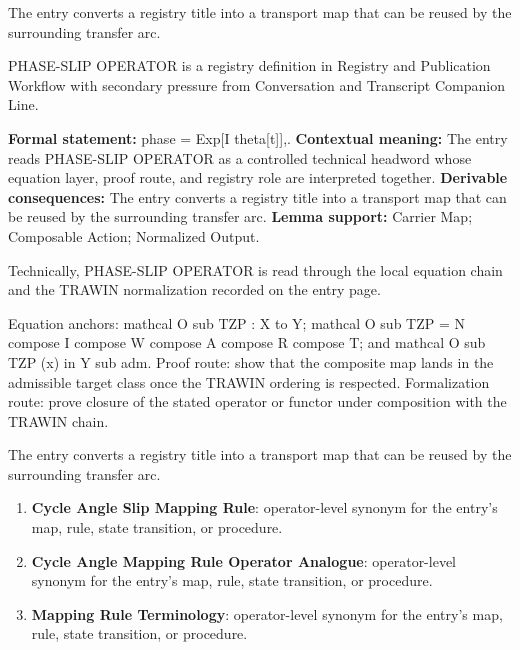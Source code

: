 The entry converts a registry title into a transport map that can be reused by the surrounding transfer arc.
\clearpage


\begingroup\small
{}
PHASE-SLIP OPERATOR is a registry definition in Registry and Publication Workflow with secondary pressure from Conversation and Transcript Companion Line.

\begingroup\footnotesize\setlength{\emergencystretch}{3em}\sloppy
\textbf{Formal statement:} phase = Exp[I theta[t]],. \textbf{Contextual meaning:} The entry reads PHASE-SLIP OPERATOR as a controlled technical headword whose equation layer, proof route, and registry role are interpreted together. \textbf{Derivable consequences:} The entry converts a registry title into a transport map that can be reused by the surrounding transfer arc. \textbf{Lemma support:} Carrier Map; Composable Action; Normalized Output.\par
\endgroup

Technically, PHASE-SLIP OPERATOR is read through the local equation chain and the TRAWIN normalization recorded on the entry page.

Equation anchors: mathcal O sub TZP : X to Y; mathcal O sub TZP = N compose I compose W compose A compose R compose T; and mathcal O sub TZP (x) in Y sub adm. Proof route: show that the composite map lands in the admissible target class once the TRAWIN ordering is respected. Formalization route: prove closure of the stated operator or functor under composition with the TRAWIN chain.

The entry converts a registry title into a transport map that can be reused by the surrounding transfer arc.
\endgroup

\begin{enumerate}[leftmargin=1.6em,itemsep=6pt,topsep=4pt]
\item \textbf{Cycle Angle Slip Mapping Rule}: operator-level synonym for the entry's map, rule, state transition, or procedure.
\item \textbf{Cycle Angle Mapping Rule Operator Analogue}: operator-level synonym for the entry's map, rule, state transition, or procedure.
\item \textbf{Mapping Rule Terminology}: operator-level synonym for the entry's map, rule, state transition, or procedure.
\end{enumerate}

